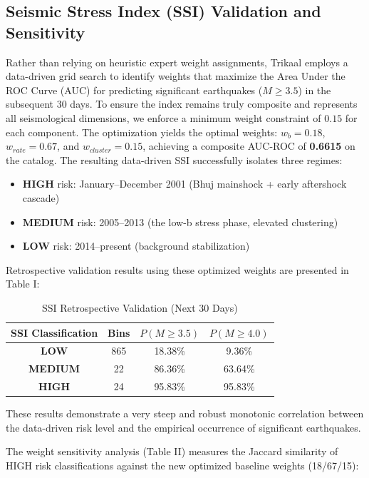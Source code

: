 \documentclass[journal]{IEEEtran}
\begin{document}
\subsection{Seismic Stress Index (SSI) Validation and Sensitivity}
Rather than relying on heuristic expert weight assignments, Trikaal employs a data-driven grid search to identify weights that maximize the Area Under the ROC Curve (AUC) for predicting significant earthquakes ($M \ge 3.5$) in the subsequent 30 days. To ensure the index remains truly composite and represents all seismological dimensions, we enforce a minimum weight constraint of $0.15$ for each component. The optimization yields the optimal weights: $w_b = 0.18$, $w_{rate} = 0.67$, and $w_{cluster} = 0.15$, achieving a composite AUC-ROC of \textbf{0.6615} on the catalog. The resulting data-driven SSI successfully isolates three regimes:
\begin{itemize}
  \item \textbf{HIGH} risk: January–December 2001 (Bhuj mainshock + early aftershock cascade)
  \item \textbf{MEDIUM} risk: 2005–2013 (the low-b stress phase, elevated clustering)
  \item \textbf{LOW} risk: 2014–present (background stabilization)
\end{itemize}

Retrospective validation results using these optimized weights are presented in Table I:

\begin{table}[h]
\centering
\caption{SSI Retrospective Validation (Next 30 Days)}
\begin{tabular}{cccc}
\toprule
SSI Classification & Bins & $P(M \ge 3.5)$ & $P(M \ge 4.0)$ \\
\midrule
\textbf{LOW} & 865 & 18.38\% & 9.36\% \\
\textbf{MEDIUM} & 22 & 86.36\% & 63.64\% \\
\textbf{HIGH} & 24 & 95.83\% & 95.83\% \\
\bottomrule
\end{tabular}
\end{table}

These results demonstrate a very steep and robust monotonic correlation between the data-driven risk level and the empirical occurrence of significant earthquakes.

The weight sensitivity analysis (Table II) measures the Jaccard similarity of HIGH risk classifications against the new optimized baseline weights (18/67/15):
\end{document}
